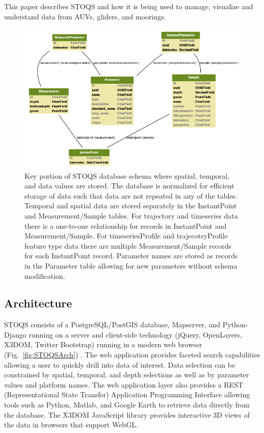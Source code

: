 \documentclass[conference]{IEEEtran}
\begin{document}
This paper describes STOQS and how it is being used to manage, visualize and understand data from AUVs, gliders, and moorings.

\begin{figure}[hbp]
\centering
\includegraphics[scale=0.5]{stoqs_simple_model.png}
\caption{Key portion of STOQS database schema where spatial, temporal, and data values are stored. The database is normalized for efficient storage of data such that data are not repeated in any of the tables. Temporal and spatial data are stored separately in the InstantPoint and Measurement/Sample tables. For trajectory and timeseries data there is a one-to-one relationship for records in InstantPoint and Measurement/Sample. For timeseriesProfile and trajecotryProfile feature type data there are multiple Measurement/Sample records for each InstantPoint record. Parameter names are stored as records in the Parameter table allowing for new parameters without schema modification.}
\label{fig:stoqs_simple_model}
\end{figure}



\subsection{Architecture}

STOQS consists of a PostgreSQL/PostGIS database, Mapserver, and Python-Django running on a server and client-side technology (jQuery, OpenLayers, X3DOM, Twitter Bootstrap) running in a modern web browser (Fig.~\ref{fig:STOQSArch}) . The web application provides faceted search capabilities allowing a user to quickly drill into data of interest. Data selection can be constrained by spatial, temporal, and depth selections as well as by parameter values and platform names. The web application layer also provides a REST (Representational State Transfer) Application Programming Interface allowing tools such as Python, Matlab, and Google Earth to retrieve data directly from the database. The X3DOM JavaScript library provides interactive 3D views of the data in browsers that support WebGL.
\end{document}
